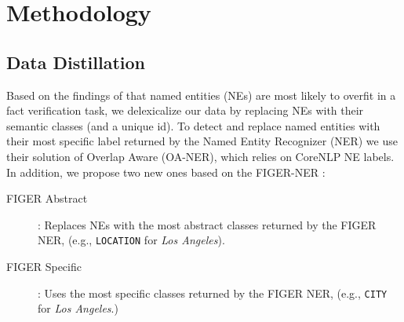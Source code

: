 \section{Methodology}

\subsection{Data Distillation}

Based on the findings of \citep{suntwal-etal-2019-importance} that named entities (NEs) are most likely to overfit in a fact verification task, we delexicalize our data by replacing NEs with their semantic classes (and a unique id). To detect and replace named entities with their most specific label returned by the Named Entity Recognizer (NER) we use their solution of Overlap Aware (OA-NER), which relies on CoreNLP \cite{manning2014stanford} NE labels. In addition, we propose two new ones based on the FIGER-NER \citep{ling2012fine}: 

\begin{description}
\item[FIGER Abstract]: Replaces NEs with the most abstract classes returned by the FIGER NER, (e.g.,  {\tt LOCATION} for {\em Los Angeles}).
\item[FIGER Specific]:  Uses the most specific classes returned by the FIGER NER, (e.g.,  {\tt CITY} for {\em Los Angeles}.)
\end{description}


